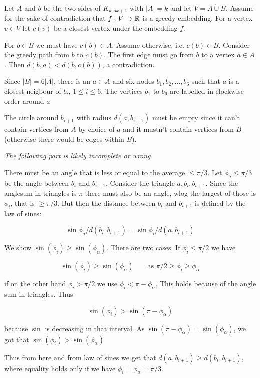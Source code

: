 \begin{pr} Let $A$ and $b$ be the two sides of $K_{k,5k+1}$ with $|A|=k$ and let $V=A\dot \cup B$. Assume for the sake of contradiction that $f:V\rightarrow \mathbb{R}$ is a greedy embedding. For a vertex $v\in V$ let $c(v)$ be a closest vertex under the embedding $f$. 

For $b\in B$ we must have $c(b)\in A$. Assume otherwise, i.e. $c(b)\in B$. Consider the greedy path from $b$ to $c(b)$. The first edge must go from $b$ to a vertex $a\in A$. Then $d(b,a) < d(b,c(b))$, a contradiction.

Since $|B|=6|A|$, there is an $a\in A$ and six nodes $b_1,b_2,\ldots, b_6$ such that $a$ is a closest neigbour of $b_i$, $1\leq i\leq 6$. The vertices $b_1$ to $b_6$ are labelled in clockwise order around $a$ %

The circle around $b_{i+1}$ with radius $d(a,b_{i+1})$ must be empty since it can't contain vertices from $A$ by choice of $a$ and it mustn't contain vertices from $B$ (otherwise there would be edges within $B$). 


\emph{The following part is likely incomplete or wrong}

There must be an angle that is less or equal to the average $\leq \pi/3$. Let $\phi_a\leq \pi/3$ be the angle between $b_i$ and $b_{i+1}$. Consider the triangle $a,b_i,b_{i+1}$. Since the anglesum in triangles is $\pi$ there must also be an angle, wlog the largest of those is $\phi_i$, that is $\geq \pi/3$. But then the distance between $b_i$ and $b_{i+1}$ is defined by the law of sines:

\[\sin \phi_a / d(b_i,b_{i+1}) = \sin \phi_i / d(a,b_{i+1})\]

We show $\sin(\phi_i) \geq \sin(\phi_\alpha)$. There are two cases. If $\phi_i \leq \pi/2$ we have

\[\sin(\phi_i) \geq \sin(\phi_\alpha) \qquad \text{as } \pi/2\geq \phi_i\geq \phi_\alpha\]

if on the other hand $\phi_i > \pi/2$ we use $\phi_i < \pi -\phi_\alpha$. This holds because of the angle sum in triangles. Thus

\[\sin(\phi_i) > \sin(\pi -\phi_\alpha)\]

because $\sin$ is decreasing in that interval. As $\sin(\pi - \phi_\alpha) = \sin(\phi_\alpha)$, we got that $\sin(\phi_i) > \sin(\phi_\alpha)$

Thus from here and from law of sines we get that $d(a, b_{i+1}) \ge d(b_i, b_{i+1})$, where equality holds only if we have $\phi_i = \phi_\alpha = \pi/3$.
\end{pr}

